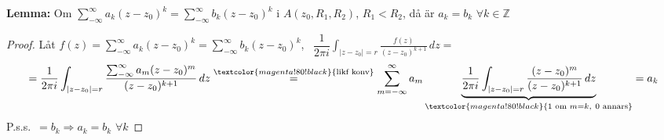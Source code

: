 \textbf{Lemma:} Om $\sum_{-\infty}^\infty a_k(z - z_0)^k = \sum_{-\infty}^\infty b_k(z - z_0)^k$ i $A(z_0, R_1, R_2)$, $R_1 < R_2$, då är $a_k = b_k$ $\forall k \in \mathbb{Z}$
\begin{proof}
Låt $f(z) = \sum_{-\infty}^\infty a_k(z - z_0)^k = \sum_{-\infty}^\infty b_k(z - z_0)^k$, \ $\dfrac{1}{2\pi i} \displaystyle\int_{|z - z_0| = r} \frac{f(z)}{(z - z_0)^{k+1}}\,dz =$
\[ = \frac{1}{2\pi i} \int_{|z - z_0| = r} \frac{\sum_{-\infty}^\infty a_m(z - z_0)^m}{(z - z_0)^{k+1}}\,dz \overset{\textcolor{magenta!80!black}{\text{likf konv}}}{=} \sum_{m = -\infty}^\infty a_m \underbrace{\frac{1}{2\pi i} \int_{|z - z_0| = r} \frac{(z - z_0)^m}{(z - z_0)^{k+1}}\,dz}_{\textcolor{magenta!80!black}{1 \text{ om } m = k,\ 0 \text{ annars}}} = a_k \]
P.s.s.\ $= b_k \Rightarrow a_k = b_k$ $\forall k$
\end{proof}
